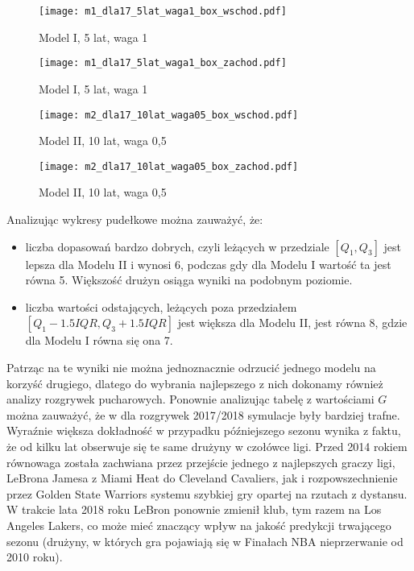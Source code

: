\documentclass[inzynierska]{pwr_wmat_praca_dyplomowa}
\theoremstyle{plain}
\numberwithin{theorem}{chapter}
\theoremstyle{definition}
\numberwithin{theorem}{chapter}
\begin{document}
\begin{figure}[t]
	\hspace*{-3cm}  
	\texttt{[image: m1\_dla17\_5lat\_waga1\_box\_wschod.pdf]}
	\caption{Model I, 5 lat, waga 1}
	\label{m1_5lat_waga1_wschod_17}
	\centering
\end{figure}

\begin{figure}[t]
	\hspace*{-3cm}  
	\texttt{[image: m1\_dla17\_5lat\_waga1\_box\_zachod.pdf]}
	\caption{Model I, 5 lat, waga 1}
	\label{m1_5lat_waga1_zachod_17}
	\centering
\end{figure}

\begin{figure}[t]
	\hspace*{-3cm}  
	\texttt{[image: m2\_dla17\_10lat\_waga05\_box\_wschod.pdf]}
	\caption{Model II, 10 lat, waga 0,5}
	\label{m2_10lat_waga05_wschod_17}
	\centering
\end{figure}

\begin{figure}[t]
	\hspace*{-3cm}  
	\texttt{[image: m2\_dla17\_10lat\_waga05\_box\_zachod.pdf]}
	\caption{Model II, 10 lat, waga 0,5}
	\label{m2_10lat_waga05_zachod_17}
	\centering
\end{figure}
Analizując wykresy pudełkowe można zauważyć, że:
\begin{itemize}
	\item liczba dopasowań bardzo dobrych, czyli leżących w przedziale $[Q_1,Q_3]$ jest lepsza dla Modelu II i wynosi 6, podczas gdy dla Modelu I wartość ta jest równa 5. Większość drużyn osiąga wyniki na podobnym poziomie.
	\item liczba wartości odstających, leżących poza przedziałem $[Q_1-1.5IQR,Q_3+1.5IQR]$ jest większa dla Modelu II, jest równa 8, gdzie dla Modelu I równa się ona 7.
\end{itemize}
Patrząc na te wyniki nie można jednoznacznie odrzucić jednego modelu na korzyść drugiego, dlatego do wybrania najlepszego z nich dokonamy również analizy rozgrywek pucharowych. Ponownie analizując tabelę z wartościami $G$ można zauważyć, że w dla rozgrywek 2017/2018 symulacje były bardziej trafne. Wyraźnie większa dokładność w przypadku późniejszego sezonu wynika z faktu, że od kilku lat obserwuje się te same drużyny w czołówce ligi. Przed 2014 rokiem równowaga została zachwiana przez przejście jednego z najlepszych graczy ligi, LeBrona Jamesa z Miami Heat do Cleveland Cavaliers, jak i rozpowszechnienie przez Golden State Warriors systemu szybkiej gry opartej na rzutach z dystansu. W trakcie lata 2018 roku LeBron ponownie zmienił klub, tym razem na Los Angeles Lakers, co może mieć znaczący wpływ na jakość predykcji trwającego sezonu (drużyny, w których gra pojawiają się w Finałach NBA nieprzerwanie od 2010 roku). 
\end{document}
